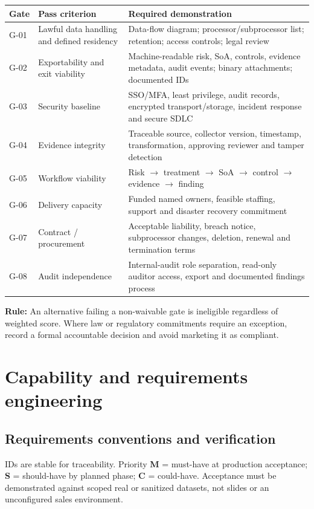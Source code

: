 \documentclass[10pt,letterpaper]{article}
\begin{document}
\begin{longtable}{@{}L{0.66in}L{2.25in}L{3.59in}@{}}
\toprule
\textbf{Gate} & \textbf{Pass criterion} & \textbf{Required demonstration}\\\midrule\endhead
G-01 & Lawful data handling and defined residency & Data-flow diagram; processor/subprocessor list; retention; access controls; legal review\\
G-02 & Exportability and exit viability & Machine-readable risk, SoA, controls, evidence metadata, audit events; binary attachments; documented IDs\\
G-03 & Security baseline & SSO/MFA, least privilege, audit records, encrypted transport/storage, incident response and secure SDLC\\
G-04 & Evidence integrity & Traceable source, collector version, timestamp, transformation, approving reviewer and tamper detection\\
G-05 & Workflow viability & Risk $\rightarrow$ treatment $\rightarrow$ SoA $\rightarrow$ control $\rightarrow$ evidence $\rightarrow$ finding\\
G-06 & Delivery capacity & Funded named owners, feasible staffing, support and disaster recovery commitment\\
G-07 & Contract / procurement & Acceptable liability, breach notice, subprocessor changes, deletion, renewal and termination terms\\
G-08 & Audit independence & Internal-audit role separation, read-only auditor access, export and documented findings process\\
\bottomrule
\end{longtable}
\normalsize
\textbf{Rule:} An alternative failing a non-waivable gate is ineligible regardless of weighted score. Where law or regulatory commitments require an exception, record a formal accountable decision and avoid marketing it as compliant.

\section{Capability and requirements engineering}
\subsection{Requirements conventions and verification}
IDs are stable for traceability. Priority \textbf{M} = must-have at production acceptance; \textbf{S} = should-have by planned phase; \textbf{C} = could-have. Acceptance must be demonstrated against scoped real or sanitized datasets, not slides or an unconfigured sales environment.
\end{document}
